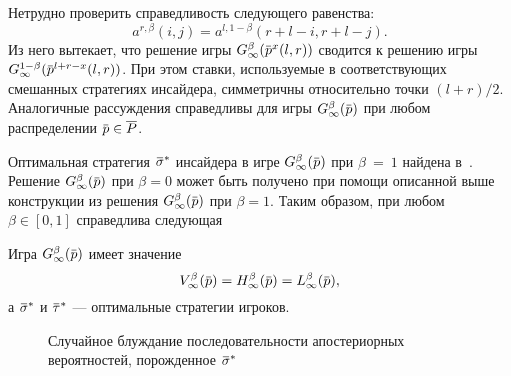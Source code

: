 {Нетрудно проверить справедливость следующего равенства:
\begin{equation*}
  a^{r, \beta}(i, j) = a^{l, 1-\beta}(r+l-i, r+l-j).
\end{equation*}
Из него вытекает, что решение игры $\theG[\infty](\p^x(l, r))$ сводится к решению игры $G^{1-\beta}_\infty(\p^{l+r-x}(l,r))$.
При этом ставки, используемые в соответствующих смешанных стратегиях инсайдера, симметричны относительно точки $(l+r)/2$.
Аналогичные рассуждения справедливы для игры $\theG[\infty](\p)$ при любом распределении $\p \in \MM$.

Оптимальная стратегия $\sigmav^*$ инсайдера в игре $\theG[\infty](\p)$ при $\beta~=~1$ найдена в~\cite{domansky11}.
Решение $\theG[\infty](\p)$ при $\beta = 0$ может быть получено при помощи описанной выше конструкции из решения $\theG[\infty](\p)$ при $\beta = 1$.
Таким образом, при любом $\beta \in [0, 1]$ справедлива следующая
\begin{theorem}
  \label{ch3:solution:theorem}
  Игра $\theG[\infty](\p)$ имеет значение
  \[
    \V[\infty](\p) = \High(\p) = \Low(\p),
  \]
  а $\sigmav^*$ и $\tauv^*$ --- оптимальные стратегии игроков.
\end{theorem}

\begin{figure}[tbh]
  \centering
  \caption[Последовательность апостериорных вероятностей]{Случайное блуждание последовательности апостериорных вероятностей, порожденное $\sigmav^*$}
  \label{ch3:fig:posterior-1}
\end{figure}

}
